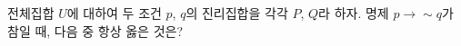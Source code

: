 전체집합 $U$에 대하여 두 조건 $p$, $q$의 진리집합을 각각 $P$, $Q$라 하자. 명제 $p\longrightarrow {\sim} q$가 참일 때, 다음 중 항상 옳은 것은?

